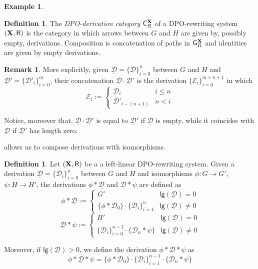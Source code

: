 \documentclass[a4paper]{article}
\newcommand{\dpo}{\textsc{dpo}}
\def\R{\mathsf{R}}
\def\X{\textbf {\textup{X}}}
\newcommand{\dder}[1]{\mathscr{#1}}
\newcommand{\der}[1]{\underline{\dder{#1}}}
\def\dpo{\mathsf{C}^{\X}_R}
\def\gpo{\mathsf{G}^{\X}_R}
\newcommand{\lgh}[0]{\mathsf{lg}}
\theoremstyle{definition}
\newtheorem{definition}[theorem]{Definition}
\newtheorem{remark}[theorem]{Remark}
\newtheorem{example}[theorem]{Example}
\begin{document}
\begin{example}
\end{example}

\begin{definition}
	The \emph{DPO-derivation category} $\dpo$ of a DPO-rewriting system $(\X, \R)$ is the category in which arrows between $G$ and $H$ are given by, possibly empty, derivations. Composition is concatenation of paths in $\gpo$ and identities are given by empty derivations.
\end{definition} 	
\begin{remark}
	More explicitly, given $\der{D}=\{\dder{D}\}_{i=0}^n$ between $G$ and $H$ and $\der{D}'=\{\dder{D}'_i\}_{i=0}^m$, their concatenation $\der{D}\cdot\der{D}'$ is the derivation $\{\dder{E}_i\}_{i=0}^{m+n+1}$ in which
	\[\dder{E}_i:=\begin{cases}
		\dder{D}_i & i \leq n\\
		\dder{D}'_{i-(n+1)} & n< i 
	\end{cases}\]	

Notice, moreover that, $\der{D}\cdot \der{D'}$ is equal to $\der{D}'$ if $\der{D}$ is empty, while it coincides with $\der{D}$ if $\der{D}'$ has length zero.
\end{remark}

  allows us to compose derivations with isomorphisms.

\begin{definition} Let $(\X, \R)$ be a a left-linear DPO-rewriting system. Given a derivation $\der{D}=\{\dder{D}_{i}\}_{i=0}^n$ between $G$ and $H$ and isomorphisms $\phi\colon G\to G'$, $\psi\colon H\to H'$, the derivations  $\phi*\der{D}$ and $\der{D}*\psi$ are defined as
	\[\phi *\der{D} := \begin{cases}
		G' & \lgh(\der{D})=0\\ 
		\{\phi* \dder{D}_0\}\cdot \{\dder{D}_i\}_{i=1}^{n}  & \lgh(\der{D})\neq 0
	\end{cases}\] 
	\[\der{D}*\psi := \begin{cases}
		H' & \lgh(\der{D})=0\\ 
		 \{\dder{D}_i\}_{i=0}^{n-1} \cdot \{\dder{D}_n*\psi\} & \lgh(\der{D})\neq 0
	\end{cases}\] 

	Moreover, if $\lgh(\der{D})>0$,  we define the derivation $\phi *\der{D} * \psi$ as
	\[\phi *\der{D} * \psi = \{\phi* \dder{D}_0\}\cdot \{\dder{D}_i\}_{i=1}^{n-1} \cdot \{\dder{D}_n*\psi\}\] 
\end{definition}
\end{document}
